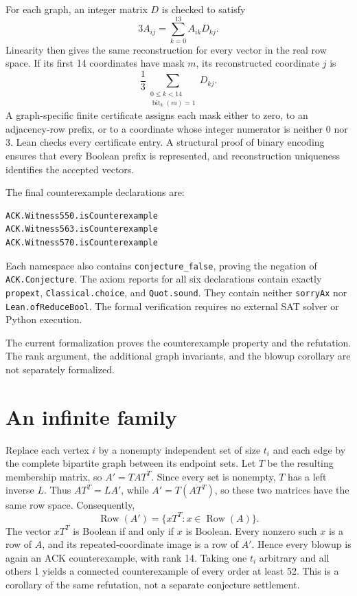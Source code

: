 \documentclass[11pt]{article}
\begin{document}
For each graph, an integer matrix $D$ is checked to satisfy
\[
  3A_{ij}=\sum_{k=0}^{13} A_{ik}D_{kj}.
\]
Linearity then gives the same reconstruction for every vector
in the real row space. If its first 14 coordinates have mask $m$,
its reconstructed coordinate $j$ is
\[
  \frac{1}{3}\sum_{\substack{0\leq k<14\\
                       \operatorname{bit}_k(m)=1}}D_{kj}.
\]
A graph-specific finite certificate assigns each mask either to
zero, to an adjacency-row prefix, or to a coordinate whose integer
numerator is neither 0 nor 3. Lean checks every certificate entry.
A structural proof of binary encoding ensures that every Boolean
prefix is represented, and reconstruction uniqueness identifies
the accepted vectors.

The final counterexample declarations are:
\begin{Verbatim}[fontsize=\small]
ACK.Witness550.isCounterexample
ACK.Witness563.isCounterexample
ACK.Witness570.isCounterexample
\end{Verbatim}
Each namespace also contains
\texttt{conjecture\_false}, proving the negation of
\texttt{ACK.Conjecture}.
The axiom reports for all six declarations contain exactly
\texttt{propext}, \texttt{Classical.choice}, and
\texttt{Quot.sound}. They contain neither
\texttt{sorryAx} nor \texttt{Lean.ofReduceBool}.
The formal verification requires no external SAT solver or
Python execution.

The current formalization proves the counterexample property and
the refutation. The rank argument, the additional graph invariants,
and the blowup corollary are not separately formalized.
\section*{An infinite family}
Replace each vertex $i$ by a nonempty independent set of size $t_i$ and each edge by the complete bipartite graph between its endpoint sets. Let $T$ be the resulting membership matrix, so $A'=TAT^T$. Since every set is nonempty, $T$ has a left inverse $L$.
Thus $AT^T=LA'$, while $A'=T(AT^T)$, so these two matrices
have the same row space. Consequently,
\[
 \operatorname{Row}(A')=\{xT^T:x\in\operatorname{Row}(A)\}.
\]
The vector $xT^T$ is Boolean if and only if $x$ is Boolean. Every nonzero such $x$ is a row of $A$, and its repeated-coordinate image is a row of $A'$. Hence every blowup is again an ACK counterexample, with rank 14. Taking one $t_i$ arbitrary and all others 1 yields a connected counterexample of every order at least 52. This is a corollary of the same refutation, not a separate conjecture settlement.
\end{document}
